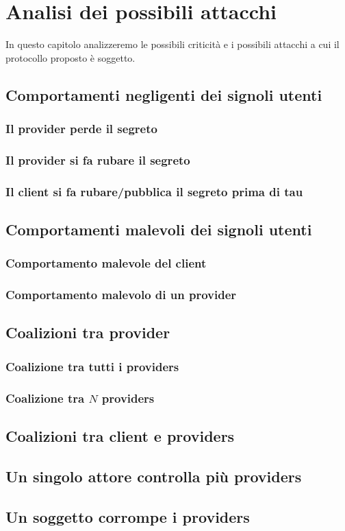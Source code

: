 \chapter{Analisi dei possibili attacchi}
\label{chap:analisi-attacchi}

In questo capitolo analizzeremo le possibili criticità e i
possibili attacchi a cui il protocollo proposto
è soggetto.

\section{Comportamenti negligenti dei signoli utenti}
\subsection{Il provider perde il segreto}
\subsection{Il provider si fa rubare il segreto}
\subsection{Il client si fa rubare/pubblica il segreto prima di tau}


\section{Comportamenti malevoli dei signoli utenti}
\subsection{Comportamento malevole del client}
\subsection{Comportamento malevolo di un provider}


\section{Coalizioni tra provider}
\subsection{Coalizione tra tutti i providers}
\subsection{Coalizione tra $ N $ providers}

\section{Coalizioni tra client e providers}

\section{Un singolo attore controlla più providers}

\section{Un soggetto corrompe i providers}